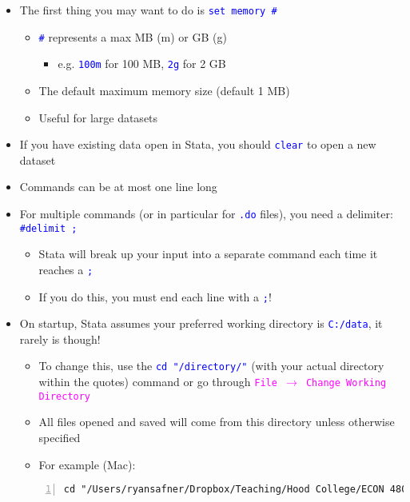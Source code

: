 \documentclass{article}
\begin{document}
\begin{itemize}
		\item The first thing you may want to do is \textcolor{blue}{\texttt{set memory \#}}
			\begin{itemize}
				\item \textcolor{blue}{\texttt{\#}} represents a max MB (m) or GB (g)
				\begin{itemize}
					\item  e.g. \textcolor{blue}{\texttt{100m}} for 100 MB, \textcolor{blue}{\texttt{2g}} for 2 GB
				\end{itemize} 
				\item The default maximum memory size (default 1 MB)
				\item Useful for large datasets
			\end{itemize}
		\item If you have existing data open in Stata, you should \textcolor{blue}{\texttt{clear}} to open a new dataset
		\item Commands can be at most one line long
		\item For multiple commands (or in particular for \textcolor{blue}{\texttt{.do}} files), you need a delimiter: \textcolor{blue}{\texttt{\#delimit ;}}
		\begin{itemize}
			\item Stata will break up your input into a separate command each time it reaches a \textcolor{blue}{\texttt{;}}
			\item If you do this, you must end each line with a \texttt{\textcolor{blue}{;}}!
		\end{itemize}
	\item On startup, Stata assumes your preferred working directory is \textcolor{blue}{\texttt{C:/data}}, it rarely is though! 
	\begin{itemize}
	\item To change this, use the \textcolor{blue}{\texttt{cd "/directory/"}} (with your actual directory within the quotes) command or go through \textcolor{magenta}{\texttt{File $\rightarrow$ Change Working Directory}}
	\end{itemize} 
	\begin{itemize}
	\item All files opened and saved will come from this directory unless otherwise specified
	\item For example (Mac): 
	\end{itemize} 
	\begin{Verbatim}[frame=single, numbers=left, numbersep=2pt] 
cd "/Users/ryansafner/Dropbox/Teaching/Hood College/ECON 480 - Econometrics"
\end{Verbatim}
	

\end{itemize}
\end{document}
